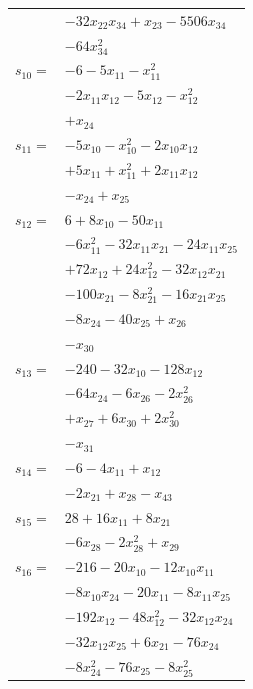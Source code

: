 \begin{longtable}{@{}r@{\;}l@{}}
 & \(\displaystyle -32x_{22}x_{34} +x_{23} -5506x_{34}\) \\
 & \(\displaystyle -64x_{34}^{2}\) \\[3pt]
\(s_{10}=\) & \(\displaystyle -6 -5x_{11} -x_{11}^{2}\) \\
 & \(\displaystyle -2x_{11}x_{12} -5x_{12} -x_{12}^{2}\) \\
 & \(\displaystyle +x_{24}\) \\[3pt]
\(s_{11}=\) & \(\displaystyle -5x_{10} -x_{10}^{2} -2x_{10}x_{12}\) \\
 & \(\displaystyle +5x_{11} +x_{11}^{2} +2x_{11}x_{12}\) \\
 & \(\displaystyle -x_{24} +x_{25}\) \\[3pt]
\(s_{12}=\) & \(\displaystyle 6 +8x_{10} -50x_{11}\) \\
 & \(\displaystyle -6x_{11}^{2} -32x_{11}x_{21} -24x_{11}x_{25}\) \\
 & \(\displaystyle +72x_{12} +24x_{12}^{2} -32x_{12}x_{21}\) \\
 & \(\displaystyle -100x_{21} -8x_{21}^{2} -16x_{21}x_{25}\) \\
 & \(\displaystyle -8x_{24} -40x_{25} +x_{26}\) \\
 & \(\displaystyle -x_{30}\) \\[3pt]
\(s_{13}=\) & \(\displaystyle -240 -32x_{10} -128x_{12}\) \\
 & \(\displaystyle -64x_{24} -6x_{26} -2x_{26}^{2}\) \\
 & \(\displaystyle +x_{27} +6x_{30} +2x_{30}^{2}\) \\
 & \(\displaystyle -x_{31}\) \\[3pt]
\(s_{14}=\) & \(\displaystyle -6 -4x_{11} +x_{12}\) \\
 & \(\displaystyle -2x_{21} +x_{28} -x_{43}\) \\[3pt]
\(s_{15}=\) & \(\displaystyle 28 +16x_{11} +8x_{21}\) \\
 & \(\displaystyle -6x_{28} -2x_{28}^{2} +x_{29}\) \\[3pt]
\(s_{16}=\) & \(\displaystyle -216 -20x_{10} -12x_{10}x_{11}\) \\
 & \(\displaystyle -8x_{10}x_{24} -20x_{11} -8x_{11}x_{25}\) \\
 & \(\displaystyle -192x_{12} -48x_{12}^{2} -32x_{12}x_{24}\) \\
 & \(\displaystyle -32x_{12}x_{25} +6x_{21} -76x_{24}\) \\
 & \(\displaystyle -8x_{24}^{2} -76x_{25} -8x_{25}^{2}\) \\

\end{longtable}
